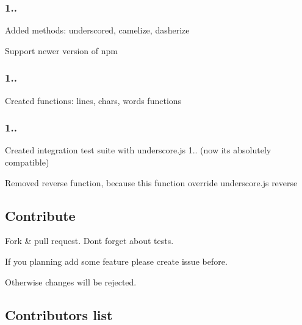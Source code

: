 \subsubsection*{1..}


\begin{DoxyItemize}
\item Added methods\+: underscored, camelize, dasherize
\item Support newer version of npm
\end{DoxyItemize}

\subsubsection*{1..}


\begin{DoxyItemize}
\item Created functions\+: lines, chars, words functions
\end{DoxyItemize}

\subsubsection*{1..}


\begin{DoxyItemize}
\item Created integration test suite with underscore.\+js 1.. (now it\textquotesingle{}s absolutely compatible)
\item Removed \textquotesingle{}reverse\textquotesingle{} function, because this function override underscore.\+js \textquotesingle{}reverse\textquotesingle{}
\end{DoxyItemize}

\subsection*{Contribute}


\begin{DoxyItemize}
\item Fork \& pull request. Don\textquotesingle{}t forget about tests.
\item If you planning add some feature please create issue before.
\end{DoxyItemize}

Otherwise changes will be rejected.

\subsection*{Contributors list}


